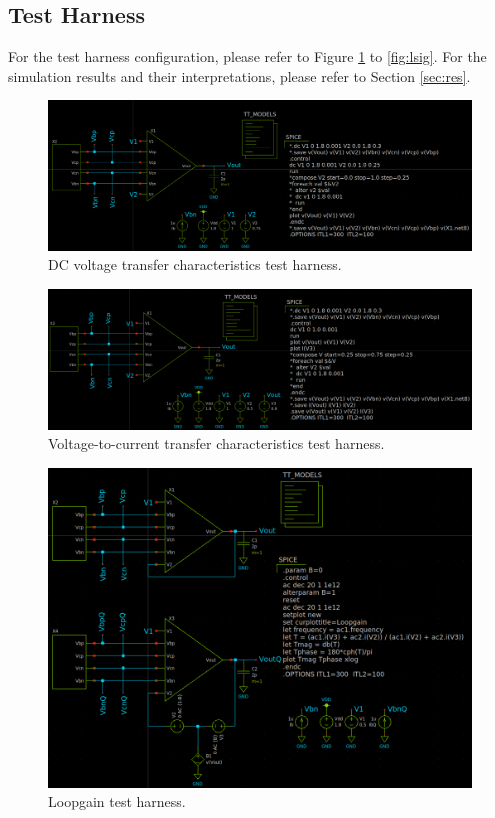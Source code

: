 \documentclass[11pt]{article}
\begin{document}
    \subsection{Test Harness}
    For the test harness configuration, please refer to Figure \ref{fig:vtc} to \ref{fig:lsig}. For the simulation results and their interpretations, please refer to Section \ref{sec:res}.
    \begin{figure}[!ht]
        \centering
        \includegraphics[width=.95\linewidth]{../img/vtc.png}
        \caption{DC voltage transfer characteristics test harness.}
        \label{fig:vtc}
    \end{figure}
    \begin{figure}[!ht]
        \centering
        \includegraphics[width=.95\linewidth]{../img/v2i.png}
        \caption{Voltage-to-current transfer characteristics test harness.}
        \label{fig:v2i}
    \end{figure}
    \begin{figure}[!ht]
        \centering
        \includegraphics[width=.85\linewidth]{../img/loopgain.png}
        \caption{Loopgain test harness.}
        \label{fig:loopgain}
    \end{figure}
\end{document}
